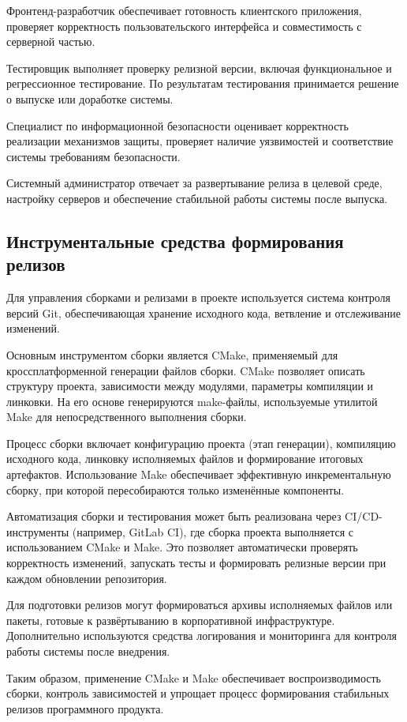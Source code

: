 \documentclass[14pt,a4paper]{extarticle}
\begin{document}
Фронтенд-разработчик обеспечивает готовность клиентского приложения, проверяет корректность пользовательского интерфейса и совместимость с серверной частью.

Тестировщик выполняет проверку релизной версии, включая функциональное и регрессионное тестирование. По результатам тестирования принимается решение о выпуске или доработке системы.

Специалист по информационной безопасности оценивает корректность реализации механизмов защиты, проверяет наличие уязвимостей и соответствие системы требованиям безопасности.

Системный администратор отвечает за развертывание релиза в целевой среде, настройку серверов и обеспечение стабильной работы системы после выпуска.

\subsection{Инструментальные средства формирования релизов}

Для управления сборками и релизами в проекте используется система контроля версий Git, обеспечивающая хранение исходного кода, ветвление и отслеживание изменений.

Основным инструментом сборки является CMake, применяемый для кроссплатформенной генерации файлов сборки. CMake позволяет описать структуру проекта, зависимости между модулями, параметры компиляции и линковки. На его основе генерируются make-файлы, используемые утилитой Make для непосредственного выполнения сборки.

Процесс сборки включает конфигурацию проекта (этап генерации), компиляцию исходного кода, линковку исполняемых файлов и формирование итоговых артефактов. Использование Make обеспечивает эффективную инкрементальную сборку, при которой пересобираются только изменённые компоненты.

Автоматизация сборки и тестирования может быть реализована через CI/CD-инструменты (например, GitLab CI), где сборка проекта выполняется с использованием CMake и Make. Это позволяет автоматически проверять корректность изменений, запускать тесты и формировать релизные версии при каждом обновлении репозитория.

Для подготовки релизов могут формироваться архивы исполняемых файлов или пакеты, готовые к развёртыванию в корпоративной инфраструктуре. Дополнительно используются средства логирования и мониторинга для контроля работы системы после внедрения.

Таким образом, применение CMake и Make обеспечивает воспроизводимость сборки, контроль зависимостей и упрощает процесс формирования стабильных релизов программного продукта.
\end{document}
